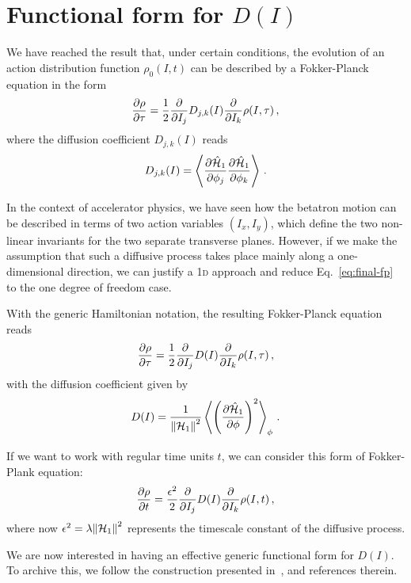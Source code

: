\section{Functional form for $D(I)$}

We have reached the result that, under certain conditions, the evolution of an action distribution function $\rho_0(I, t)$ can be described by a Fokker-Planck equation in the form
\begin{equation}
    \pdv{\rho}{\tau}=\frac{1}{2}\pdv{}{I_j} D_{j,k}(I) \pdv{}{I_k}\rho(I,\tau)\,,
    \label{eq:final-fp}
\end{equation} 
where the diffusion coefficient $D_{j,k}(I)$ reads
\begin{equation}
    D_{j,k}(I) = \left\langle\pdv{\hat{\mathcal{H}}_1}{\phi_j}\pdv{\hat{\mathcal{H}}_1}{\phi_k}\right\rangle \,.
\end{equation}

In the context of accelerator physics, we have seen how the betatron motion can be described in terms of two action variables $(I_x, I_y)$, which define the two non-linear invariants for the two separate transverse planes. However, if we make the assumption that such a diffusive process takes place mainly along a one-dimensional direction, we can justify a 1\textsc{d} approach and reduce Eq.~\eqref{eq:final-fp} to the one degree of freedom case.

With the generic Hamiltonian notation, the resulting Fokker-Planck equation reads
\begin{equation}
    \pdv{\rho}{\tau}=\frac{1}{2}\pdv{}{I_j} D(I) \pdv{}{I_k}\rho(I,\tau)\,,
\end{equation}
with the diffusion coefficient given by
\begin{equation}
    D(I) = \frac{1}{\norm{\mathcal{H}_1}^2} \left\langle \left( \pdv{\hat{\mathcal{H}}_1}{\phi} \right)^2 \right\rangle_\phi \,.
\end{equation}

If we want to work with regular time units $t$, we can consider this form of Fokker-Plank equation:
\begin{equation}
    \pdv{\rho}{t}=\frac{\epsilon^2}{2}\pdv{}{I_j} D(I) \pdv{}{I_k}\rho(I,t)\,,
\end{equation}
where now $\epsilon^2 = \lambda\norm{\mathcal{H}_1}^2$ represents the timescale constant of the diffusive process.

We are now interested in having an effective generic functional form for $D(I)$. To archive this, we follow the construction presented in~\cite{Bazzani:2019lse}, and references therein.

